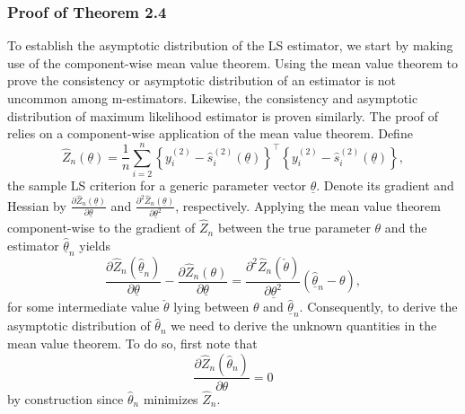 \documentclass[12pt,a4paper]{article}
\theoremstyle{definition}
\begin{document}
\subsubsection{Proof of Theorem 2.4}
\label{ProofAsymptoticDistribution}
To establish the asymptotic distribution of the LS estimator, we start by making use of the component-wise mean value theorem. Using the mean value theorem to prove the consistency or asymptotic distribution of an estimator is not uncommon among m-estimators. Likewise, the consistency and asymptotic distribution of maximum likelihood estimator is proven similarly. The proof of  relies on a component-wise application of the mean value theorem. Define
\[
\hat{Z}_n(\underline{\theta})
=
\frac{1}{n}\sum_{i=2}^n
\left\{ y_i^{(2)}-\hat{s}_i^{(2)}(\underline{\theta})\right\}^\top
\left\{ y_i^{(2)}-\hat{s}_i^{(2)}(\underline{\theta})\right\},
\]
the sample LS criterion for a generic parameter vector $\underline{\theta}$.
Denote its gradient and Hessian by
$\frac{\partial \hat{Z}_n(\underline{\theta})}{\partial\underline{\theta}}$
and
$\frac{\partial^2 \hat{Z}_n(\underline{\theta})}{\partial\underline{\theta}^2}$,
respectively.
Applying the mean value theorem component-wise to the gradient of $\hat{Z}_n$ between the true parameter $\theta$ and the estimator $\underline{\hat{\theta}}_n$ yields
\[
\frac{\partial \hat{Z}_n(\underline{\hat{\theta}}_n)}{\partial\underline{\theta}}
-
\frac{\partial \hat{Z}_n(\theta)}{\partial\underline{\theta}}
=
\frac{\partial^2 \hat{Z}_n(\check{\theta})}{\partial\underline{\theta}^2}
(\underline{\hat{\theta}}_n-\theta),
\]
for some intermediate value $\check{\theta}$ lying between $\theta$ and
$\underline{\hat{\theta}}_n$.
Consequently, to derive the asymptotic distribution of $\hat\theta_n$ we need to derive the unknown quantities in the mean value theorem.
To do so, first note that
\begin{equation}
\frac{\partial \hat Z_n(\hat\theta_n)}{\partial \theta} = 0
\end{equation}
by construction since $\hat\theta_n$ minimizes $\hat{Z}_n$.
\end{document}
